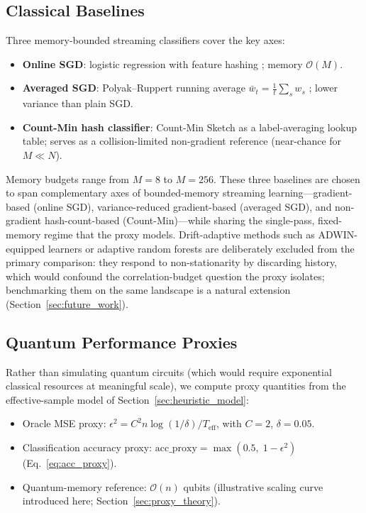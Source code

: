 \documentclass[sensors,article,submit,pdftex,moreauthors]{Definitions/mdpi}
\newcommand{\bigO}{\mathcal{O}}
\newcommand{\Teff}{T_{\mathrm{eff}}}
\providecommand{\DIFadd}[1]{{\protect\color{blue}#1}} %
\providecommand{\DIFdel}[1]{} %
\providecommand{\DIFaddbegin}{} %
\providecommand{\DIFaddend}{} %
\providecommand{\DIFdelbegin}{} %
\providecommand{\DIFdelend}{} %
\begin{document}
\DIFaddend \subsection{Classical Baselines}

Three memory-bounded streaming classifiers cover the key axes:
\begin{itemize}
    \item \textbf{Online SGD}: logistic regression with feature hashing \citep{weinberger2009featurehashing, shalev2012online}; memory $\bigO(M)$.
    \item \textbf{Averaged SGD}: Polyak--Ruppert running average $\bar{w}_t = \frac{1}{t}\sum_s w_s$ \citep{polyak1992averaging}; lower variance than plain SGD.
    \item \textbf{Count-Min hash classifier}: Count-Min Sketch \citep{cormode2005improved} as a label-averaging lookup table; serves as a collision-limited non-gradient reference (near-chance for $M \ll N$).
\end{itemize}
Memory budgets range from $M = 8$ to $M = 256$. \DIFaddbegin \DIFadd{These three baselines are chosen to span complementary axes of bounded-memory streaming learning---gradient-based (online SGD), variance-reduced gradient-based (averaged SGD), and non-gradient hash-count-based (Count-Min)---while sharing the single-pass, fixed-memory regime that the proxy models. Drift-adaptive methods such as ADWIN-equipped learners or adaptive random forests }\citep{bifet2007adwin, gomes2017adaptiverf} \DIFadd{are deliberately excluded from the primary comparison: they respond to non-stationarity by discarding history, which would confound the correlation-budget question the proxy isolates; benchmarking them on the same landscape is a natural extension (Section~\ref{sec:future_work}).
}\DIFaddend 

\subsection{Quantum Performance Proxies}
\label{sec:quantum_proxies}

Rather than simulating quantum circuits (which would require exponential classical resources at meaningful scale), we compute proxy quantities from the effective-sample model of Section~\ref{sec:heuristic_model}:
\begin{itemize}
    \item Oracle MSE proxy: $\epsilon^2 = C^2 n \log(1/\delta) / \Teff$, with $C = 2$, $\delta = 0.05$.
    \item Classification accuracy proxy: $\mathrm{acc\_proxy} = \max(0.5,\; 1 - \epsilon^2)$ (Eq.~\ref{eq:acc_proxy}).
    \item \DIFdelbegin \DIFdel{Quantum memory}\DIFdelend \DIFaddbegin \DIFadd{Quantum-memory reference}\DIFaddend : $\bigO(n)$ qubits \DIFdelbegin %
\DIFdelend \DIFaddbegin \DIFadd{(illustrative scaling curve introduced here; Section~\ref{sec:proxy_theory})}\DIFaddend .
\end{itemize}
\end{document}
